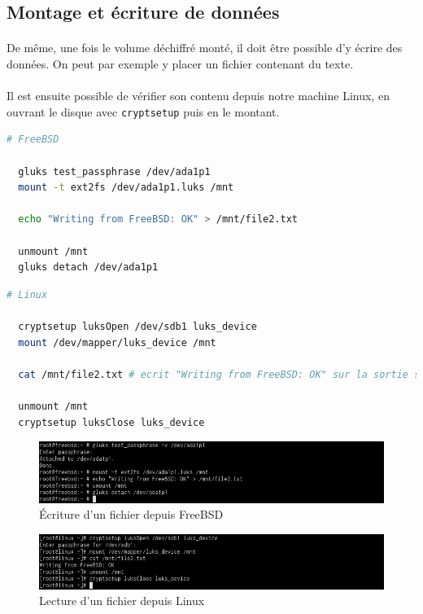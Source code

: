 \subsection{Montage et écriture de données}
\paragraph{}
De même, une fois le volume déchiffré monté, il doit être possible d'y écrire
des données. On peut par exemple y placer un fichier contenant du texte.
\paragraph{}
Il est ensuite possible de vérifier son contenu depuis notre machine Linux, en
ouvrant le disque avec \texttt{cryptsetup} puis en le montant.
\\
\begin{lstlisting}[language=bash]
  # FreeBSD

  gluks test_passphrase /dev/ada1p1
  mount -t ext2fs /dev/ada1p1.luks /mnt
  
  echo "Writing from FreeBSD: OK" > /mnt/file2.txt

  unmount /mnt
  gluks detach /dev/ada1p1
\end{lstlisting}
\begin{lstlisting}[language=bash]
  # Linux

  cryptsetup luksOpen /dev/sdb1 luks_device
  mount /dev/mapper/luks_device /mnt
  
  cat /mnt/file2.txt # ecrit "Writing from FreeBSD: OK" sur la sortie standard

  unmount /mnt
  cryptsetup luksClose luks_device
\end{lstlisting}
\begin{figure}[H]
  \centering
  \includegraphics[width=\linewidth]{tests/freebsd_write_file.png}
  \caption{\label{fig:freebsd_write_file}Écriture d'un fichier depuis FreeBSD}
\end{figure}
\begin{figure}[H]
  \centering
  \includegraphics[width=\linewidth]{tests/linux_read_file.png}
  \caption{\label{fig:linux_read_file}Lecture d'un fichier depuis Linux}
\end{figure}

